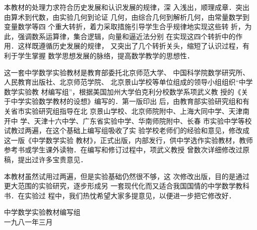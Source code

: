     本教材的处理力求符合历史发展和认识发展的规律，深
入浅出，顺理成章．突出由算术到代数，由实验几何到论证
几何，由综合几何到解析几何，由常量数学到变量数学等四
个重大转折，着力采取措施引导学生合乎规律地实现这些转
折，为此，强调数系运算律，集合逻辑，向量和逼近法分别
在实现这四个转折中的作用．这样既遵循历史发展的规律，
又突出了几个转折关头，缩短了认识过程，有利于学生掌握
数学思想发展的脉络，提高数学教学的思想性．

这一套中学数学实验教材是教育部委托北京师范大学、
中国科学院数学研究所、人民教育出版社、北京师范学院、
北京景山学校等单位组成的领导小组组织“中学数学实验教
材编写组”，根据美国加州大学伯克利分校数学系项武义教
授的《关于中学实验数学教材的设想》编写的．第一版印出
后，由教育部实验研究组和有关省市实验研究组指导在北
京景山学校、北京师院附中、上海大同中学、天津南开中
学、天津十六中学、广东省实验中学、华南师院附中、长春
市实验中学等校试教过两遍，在这个基础上编写组吸收了实
验学校老师们的经验和意见，修改成这一版《中学数学实验
教材》，正式出版，内部发行，供中学选作实验教材，教师
参考书或学生课外读物．在编写和修订过程中，项武义教授
曾数次详细修改过原稿，提出过许多宝贵意见．

    本教材虽然试用过两遍，但是实验基础仍然很不够，这
次修改出版，目的是通过更大范围的实验研究，逐步形成另
一套现代化而又适合我国国情的中学数学教科书．在实验过
程中，我们热忱希望大家多提意见，以便进一步把它修改好．

\begin{flushright}
    中学数学实验教材编写组\\
    一九八一年三月
\end{flushright}







